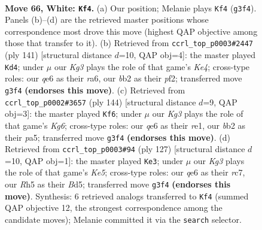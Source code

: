 \documentclass[11pt]{article}
\begin{document}
\clearpage

\begin{figure}[p]\centering
\begin{subfigure}{0.46\textwidth}\centering
\resizebox{\linewidth}{!}{%
\newchessgame
\chessboard[
  setfen={8/8/4q3/7R/1p6/3k1BK1/1b6/8 w - - 22 66},
  showmover=false,
  pgfstyle=straightmove, color=movearrow, markmove={g3-f4}
]}
\caption{}
\end{subfigure}\hfill
\begin{subfigure}{0.46\textwidth}\centering
\resizebox{\linewidth}{!}{%
\newchessgame
\chessboard[
  setfen={8/8/R7/3bk3/8/1r6/3K1P2/8 b - - 9 71},
  showmover=false,
  pgfstyle=straightmove, color=movearrow, markmove={e5-d4}
]}
\caption{}
\end{subfigure}
\\[4pt]
\begin{subfigure}{0.46\textwidth}\centering
\resizebox{\linewidth}{!}{%
\newchessgame
\chessboard[
  setfen={6k1/8/6K1/p5B1/7R/8/8/4r3 w - - 6 73},
  showmover=false,
  pgfstyle=straightmove, color=movearrow, markmove={g6-f6}
]}
\caption{}
\end{subfigure}\hfill
\begin{subfigure}{0.46\textwidth}\centering
\resizebox{\linewidth}{!}{%
\newchessgame
\chessboard[
  setfen={8/2R5/8/3b4/4k3/P7/7r/5K2 b - - 5 64},
  showmover=false,
  pgfstyle=straightmove, color=movearrow, markmove={e4-e3}
]}
\caption{}
\end{subfigure}
\caption{\textbf{Move 66, White: \texttt{Kf4}.} (a) Our position; Melanie plays \texttt{Kf4} (\texttt{g3f4}). Panels (b)--(d) are the retrieved master positions whose correspondence most drove this move (highest QAP objective among those that transfer to it). (b) Retrieved from \texttt{ccrl\_top\_p0003\#2447} (ply 141) [structural distance $d$=10, QAP obj=4]: the master played \texttt{Kd4}; under $\mu$ our \emph{Kg3} plays the role of that game's \emph{Ke4}; cross-type roles: our \emph{q}e6 as their \emph{r}a6, our \emph{b}b2 as their \emph{p}f2; transferred move \texttt{g3f4} \textbf{(endorses this move)}. (c) Retrieved from \texttt{ccrl\_top\_p0002\#3657} (ply 144) [structural distance $d$=9, QAP obj=3]: the master played \texttt{Kf6}; under $\mu$ our \emph{Kg3} plays the role of that game's \emph{Kg6}; cross-type roles: our \emph{q}e6 as their \emph{r}e1, our \emph{b}b2 as their \emph{p}a5; transferred move \texttt{g3f4} \textbf{(endorses this move)}. (d) Retrieved from \texttt{ccrl\_top\_p0003\#94} (ply 127) [structural distance $d$=10, QAP obj=1]: the master played \texttt{Ke3}; under $\mu$ our \emph{Kg3} plays the role of that game's \emph{Ke5}; cross-type roles: our \emph{q}e6 as their \emph{r}c7, our \emph{R}h5 as their \emph{B}d5; transferred move \texttt{g3f4} \textbf{(endorses this move)}. Synthesis: 6 retrieved analogs transferred to \texttt{Kf4} (summed QAP objective 12, the strongest correspondence among the candidate moves); Melanie committed it via the \texttt{search} selector.}
\label{fig:thought-m130}
\end{figure}
\end{document}

